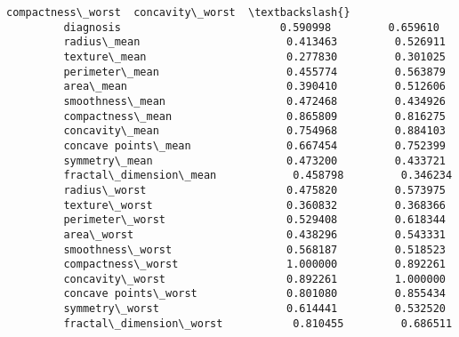 \documentclass[11pt]{article}
\begin{document}
\begin{Verbatim}[commandchars=\\\{\}]
                                  compactness\_worst  concavity\_worst  \textbackslash{}
         diagnosis                         0.590998         0.659610   
         radius\_mean                       0.413463         0.526911   
         texture\_mean                      0.277830         0.301025   
         perimeter\_mean                    0.455774         0.563879   
         area\_mean                         0.390410         0.512606   
         smoothness\_mean                   0.472468         0.434926   
         compactness\_mean                  0.865809         0.816275   
         concavity\_mean                    0.754968         0.884103   
         concave points\_mean               0.667454         0.752399   
         symmetry\_mean                     0.473200         0.433721   
         fractal\_dimension\_mean            0.458798         0.346234   
         radius\_worst                      0.475820         0.573975   
         texture\_worst                     0.360832         0.368366   
         perimeter\_worst                   0.529408         0.618344   
         area\_worst                        0.438296         0.543331   
         smoothness\_worst                  0.568187         0.518523   
         compactness\_worst                 1.000000         0.892261   
         concavity\_worst                   0.892261         1.000000   
         concave points\_worst              0.801080         0.855434   
         symmetry\_worst                    0.614441         0.532520   
         fractal\_dimension\_worst           0.810455         0.686511   
         

\end{Verbatim}
\end{document}
